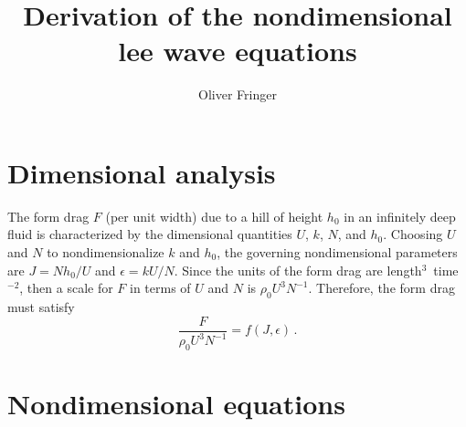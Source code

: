 \documentclass[12pt]{article}
\begin{document}
\title{Derivation of the nondimensional lee wave equations}

\author{Oliver Fringer}

\maketitle

\section{Dimensional analysis}

The form drag $F$ (per unit width) due to a hill of height $h_0$ in an infinitely 
deep fluid is characterized by the dimensional quantities
$U$, $k$, $N$, and $h_0$.  Choosing $U$ and $N$ to nondimensionalize $k$ and $h_0$, the governing
nondimensional parameters are $J = N h_0/U$ and $\epsilon = k U/N$.  Since the units of the form drag
are length$^3$~time$^{-2}$, then a scale for $F$ in terms of $U$ and $N$ is $\rho_0 U^3 N^{-1}$. Therefore,
the form drag must satisfy
\[
\frac{F}{\rho_0 U^3 N^{-1}} = f(J, \epsilon)\,.
\]

\section{Nondimensional equations} \label{eq:equations}
\end{document}
